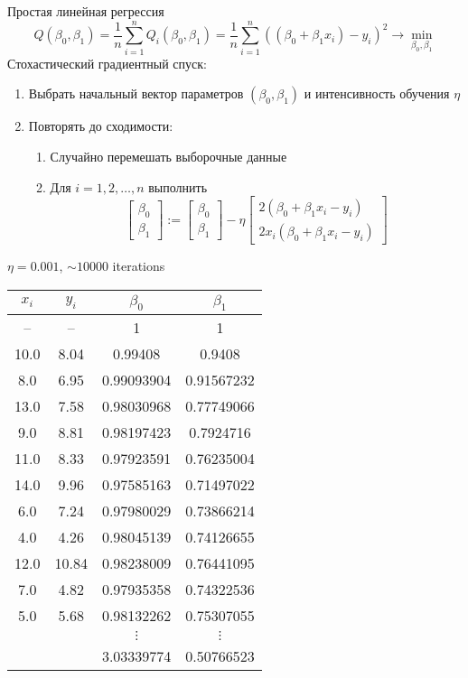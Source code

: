 \documentclass[landscape]{slides}
\begin{document}
\begin{slide}
Простая линейная регрессия
$$ Q(\beta_0,\beta_1) = \frac 1n \sum_{i=1}^n Q_i(\beta_0, \beta_1) =  \frac 1n \sum_{i=1}^n ((\beta_0 + \beta_1 x_i) - y_i)^2 \to \min_{\beta_0, \beta_1} $$
Стохастический градиентный спуск:
\begin{enumerate}
\item Выбрать начальный вектор параметров $(\beta_0, \beta_1)$ и интенсивность обучения $\eta$
\item Повторять до сходимости:
\begin{enumerate}
\item Случайно перемешать выборочные данные
\item Для $i=1,2,\ldots,n$ выполнить
$$
\left[\begin{array}{c}
\beta_0 \\ \beta_1
\end{array}\right]
:= 
\left[\begin{array}{c}
\beta_0 \\ \beta_1
\end{array}\right]
- \eta
\left[\begin{array}{c}
2(\beta_0 + \beta_1 x_i - y_i) \\
2x_i(\beta_0 + \beta_1 x_i - y_i)
\end{array}\right]
$$
\end{enumerate}
\end{enumerate}
\end{slide}


\begin{slide}
$\eta=0.001$, $\sim 10000$ iterations

\begin{tabular}{c|c|cc}
   $x_i$ & $y_i$ & $\beta_0$ & $\beta_1$ \\
\hline
  -- &    -- &       1     & 1 \\
10.0 &  8.04 &  0.99408    & 0.9408\\
 8.0 &  6.95 &  0.99093904 & 0.91567232\\
13.0 &  7.58 &  0.98030968 & 0.77749066\\
 9.0 &  8.81 &  0.98197423 & 0.7924716 \\
11.0 &  8.33 &  0.97923591 & 0.76235004\\
14.0 &  9.96 &  0.97585163 & 0.71497022\\
 6.0 &  7.24 &  0.97980029 & 0.73866214\\
 4.0 &  4.26 &  0.98045139 & 0.74126655\\
12.0 & 10.84 &  0.98238009 & 0.76441095\\
 7.0 &  4.82 &  0.97935358 & 0.74322536\\
 5.0 &  5.68 &  0.98132262 & 0.75307055\\
     &       &  $\vdots$   & $\vdots$  \\
     &       &  3.03339774 & 0.50766523
\end{tabular}
\end{slide}
\end{document}
